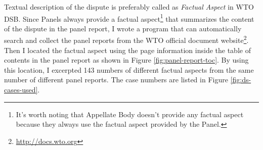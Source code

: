 Textual description of the dispute is preferably called as
\textit{Factual Aspect} in WTO DSB.
Since Panels
always provide a factual aspect\footnote{
  It's worth noting that Appellate Body doesn't provide any factual aspect because they always use the factual aspect provided by the Panel.
}
that summarizes the content of the dispute
in the panel report, %
I wrote a program that can
automatically search and collect
the panel reports from the WTO official document website\footnote{
  \url{http://docs.wto.org}
}.
Then I located the factual aspect using the page information inside the
table of contents in the panel report as shown in Figure \ref{fig:panel-report-toc}.
By using this location, I excerpted 143 numbers of different factual aspects from the same number of different panel reports. The case numbers are listed in Figure \ref{fig:ds-cases-used}.
